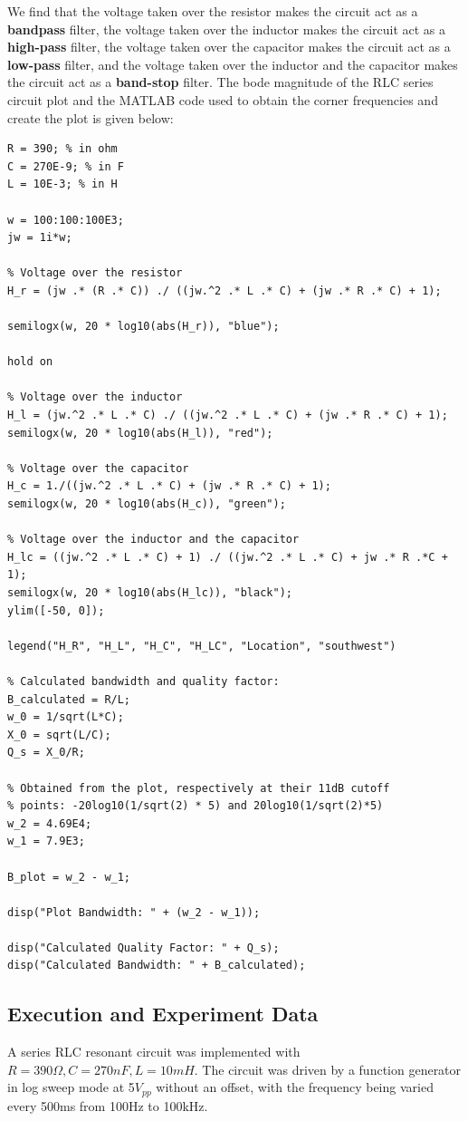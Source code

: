 We find that the voltage taken over the resistor makes the circuit act as a {\bf bandpass} filter, the voltage taken over the
inductor makes the circuit act as a {\bf high-pass} filter,
the voltage taken over the capacitor makes the circuit act as a {\bf low-pass} filter, and the voltage taken over the inductor and the capacitor makes the circuit act as a {\bf band-stop} filter.
The bode magnitude of the RLC series circuit plot and the MATLAB code used to obtain the corner frequencies and create the plot is given below:
\begin{verbatim}
R = 390; % in ohm
C = 270E-9; % in F
L = 10E-3; % in H

w = 100:100:100E3;
jw = 1i*w;

% Voltage over the resistor
H_r = (jw .* (R .* C)) ./ ((jw.^2 .* L .* C) + (jw .* R .* C) + 1);

semilogx(w, 20 * log10(abs(H_r)), "blue");

hold on

% Voltage over the inductor
H_l = (jw.^2 .* L .* C) ./ ((jw.^2 .* L .* C) + (jw .* R .* C) + 1);
semilogx(w, 20 * log10(abs(H_l)), "red");

% Voltage over the capacitor
H_c = 1./((jw.^2 .* L .* C) + (jw .* R .* C) + 1);
semilogx(w, 20 * log10(abs(H_c)), "green");

% Voltage over the inductor and the capacitor
H_lc = ((jw.^2 .* L .* C) + 1) ./ ((jw.^2 .* L .* C) + jw .* R .*C + 1);
semilogx(w, 20 * log10(abs(H_lc)), "black");
ylim([-50, 0]);

legend("H_R", "H_L", "H_C", "H_LC", "Location", "southwest")

% Calculated bandwidth and quality factor:
B_calculated = R/L;
w_0 = 1/sqrt(L*C);
X_0 = sqrt(L/C);
Q_s = X_0/R;

% Obtained from the plot, respectively at their 11dB cutoff
% points: -20log10(1/sqrt(2) * 5) and 20log10(1/sqrt(2)*5)
w_2 = 4.69E4;
w_1 = 7.9E3;

B_plot = w_2 - w_1;

disp("Plot Bandwidth: " + (w_2 - w_1));

disp("Calculated Quality Factor: " + Q_s);
disp("Calculated Bandwidth: " + B_calculated);
\end{verbatim}

\subsection{Execution and Experiment Data}
A series RLC resonant circuit was implemented with $R=390\Omega, C=270nF, L=10mH$. The circuit was driven by a function generator in log sweep mode at 5$V_{pp}$ without an offset, with the frequency being varied every 500ms from 100Hz to 100kHz.

